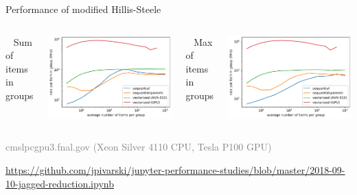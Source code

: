 \documentclass[aspectratio=169]{beamer}
\begin{document}
\begin{frame}{Performance of modified Hillis-Steele}
\large
\vspace{0.5 cm}
\begin{columns}
\mbox{ } \hfill Sum of items in groups \hfill \mbox{ }

\includegraphics[width=\linewidth]{sum_rates_logy.pdf}

\mbox{ } \hfill Max of items in groups \hfill \mbox{ }

\includegraphics[width=\linewidth]{max_rates_logy.pdf}
\end{columns}

\vspace{0.5 cm}
\normalsize
\textcolor{gray}{cmslpcgpu3.fnal.gov (Xeon Silver 4110 CPU, Tesla P100 GPU)}

\vspace{0.25 cm}
\textcolor{blue}{\small\url{https://github.com/jpivarski/jupyter-performance-studies/blob/master/2018-09-10-jagged-reduction.ipynb}}
\end{frame}
\end{document}
